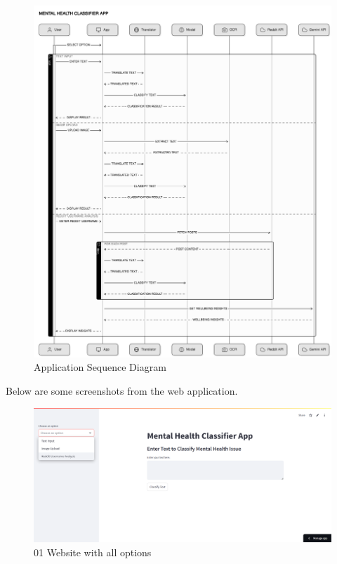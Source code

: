 \begin{figure}[h!]  
    \centering
    \includegraphics[width=1.0\textwidth]{Images/Sequence Diagram.png}  
    \caption{Application Sequence Diagram}
    \label{SequenceD}  %
\end{figure}

\noindent
Below are some screenshots from the web application.

\pagebreak

\begin{figure}[h!]  
    \centering
    \includegraphics[width=1.0\textwidth]{App Images/01 Interface.png}  
    \caption{01 Website with all options}
    \label{01i}  %
\end{figure}


